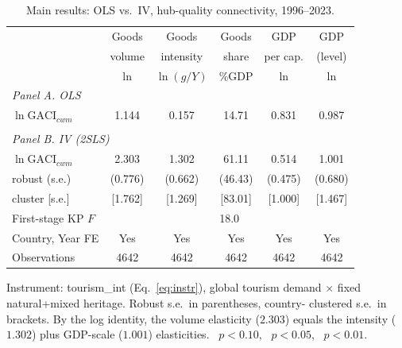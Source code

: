 \documentclass[review,3p,times]{elsarticle}
\newcommand{\sym}[1]{\rlap{$^{#1}$}}
\begin{document}
\begin{table}[t]
\centering
\caption{Main results: OLS vs.\ IV, hub-quality connectivity, 1996--2023.}
\label{tab:main}
\begin{threeparttable}
\small
\begin{tabular}{lccccc}
\toprule
 & \multicolumn{1}{c}{Goods} & \multicolumn{1}{c}{Goods} & \multicolumn{1}{c}{Goods}
 & \multicolumn{1}{c}{GDP} & \multicolumn{1}{c}{GDP} \\
 & \multicolumn{1}{c}{volume} & \multicolumn{1}{c}{intensity} & \multicolumn{1}{c}{share}
 & \multicolumn{1}{c}{per cap.} & \multicolumn{1}{c}{(level)} \\
 & \multicolumn{1}{c}{$\ln$} & \multicolumn{1}{c}{$\ln(g/Y)$} & \multicolumn{1}{c}{\%GDP}
 & \multicolumn{1}{c}{$\ln$} & \multicolumn{1}{c}{$\ln$} \\
\midrule
\multicolumn{6}{l}{\emph{Panel A. OLS}}\\
$\ln\text{GACI}_{cwm}$ & 1.144\sym{***} & 0.157\sym{***} & 14.71\sym{***} & 0.831\sym{***} & 0.987\sym{***} \\
\\
\multicolumn{6}{l}{\emph{Panel B. IV (2SLS)}}\\
$\ln\text{GACI}_{cwm}$ & 2.303\sym{***} & 1.302\sym{**} & 61.11 & 0.514 & 1.001 \\
\quad robust (s.e.)    & (0.776) & (0.662) & (46.43) & (0.475) & (0.680) \\
\quad cluster [s.e.]   & [1.762] & [1.269] & [83.01] & [1.000] & [1.467] \\
\midrule
First-stage KP $F$ & \multicolumn{5}{c}{18.0} \\
Country, Year FE   & Yes & Yes & Yes & Yes & Yes \\
Observations       & 4642 & 4642 & 4642 & 4642 & 4642 \\
\bottomrule
\end{tabular}
\begin{tablenotes}\footnotesize
\item Instrument: tourism\_int (Eq.~\ref{eq:instr}), global tourism demand
$\times$ fixed natural+mixed heritage. Robust s.e.\ in parentheses, country-
clustered s.e.\ in brackets. By the log identity, the volume elasticity
($2.303$) equals the intensity ($1.302$) plus GDP-scale ($1.001$) elasticities.
\sym{*}~$p<0.10$, \sym{**}~$p<0.05$, \sym{***}~$p<0.01$.
\end{tablenotes}
\end{threeparttable}
\end{table}
\end{document}
